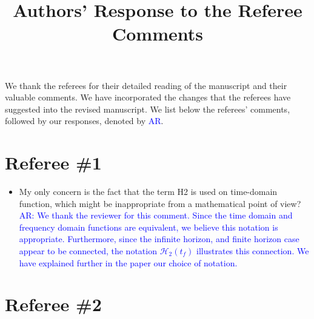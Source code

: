 \documentclass[11pt]{article}
\title{Authors' Response to the Referee Comments}
\author{}
\date{}
\def\serkan#1{\textcolor{blue}{{#1}}}
\begin{document}
\maketitle

We thank the referees {for their detailed reading of the manuscript and their valuable comments}.
 We have incorporated the changes that the referees have suggested into the revised
manuscript.   We list below the referees' comments, followed by our responses, denoted by \serkan{\textsf{AR}}.  

\section*{Referee \#1}%

\begin{itemize}
\item My only concern is the fact that the term H2 is used on time-domain
function, which might be inappropriate from a mathematical point of
view?\\
\serkan{\textsf{AR}: We thank the reviewer for this comment. Since the time domain and frequency domain functions are equivalent, we believe this notation is appropriate. Furthermore, since the infinite horizon, and finite horizon case appear to be connected, the notation $\mathcal{H}_2(t_f)$ illustrates this connection. We have explained further in the paper our choice of notation.
} 
\end{itemize}

\section*{Referee \#2}
\end{document}
